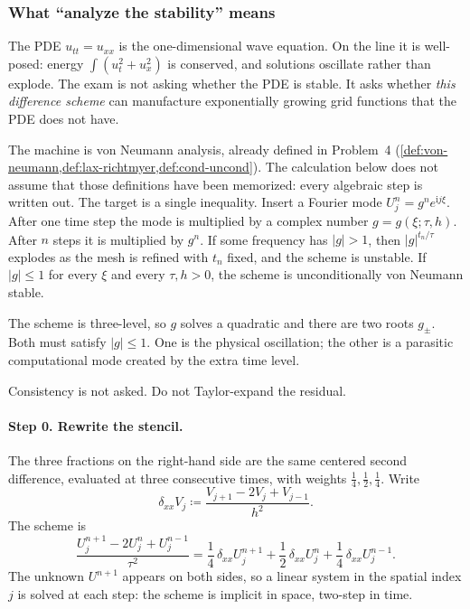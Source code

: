 \setcounter{section}{5}
\setcounter{theorem}{0}
\setcounter{definition}{0}
\setcounter{remark}{0}
\setcounter{note}{0}

\subsubsection{What ``analyze the stability'' means}

The PDE \(u_{tt}=u_{xx}\) is the one-dimensional wave equation. On the line it is well-posed: energy \(\int(u_t^2+u_x^2)\) is conserved, and solutions oscillate rather than explode. The exam is not asking whether the PDE is stable. It asks whether \emph{this difference scheme} can manufacture exponentially growing grid functions that the PDE does not have.

The machine is von Neumann analysis, already defined in Problem~4 (\cref{def:von-neumann,def:lax-richtmyer,def:cond-uncond}). The calculation below does not assume that those definitions have been memorized: every algebraic step is written out. The target is a single inequality. Insert a Fourier mode \(U_j^n=g^n e^{\mathrm i j\xi}\). After one time step the mode is multiplied by a complex number \(g=g(\xi;\tau,h)\). After \(n\) steps it is multiplied by \(g^n\). If some frequency has \(|g|>1\), then \(|g|^{t_n/\tau}\) explodes as the mesh is refined with \(t_n\) fixed, and the scheme is unstable. If \(|g|\le 1\) for every \(\xi\) and every \(\tau,h>0\), the scheme is unconditionally von Neumann stable.

The scheme is three-level, so \(g\) solves a quadratic and there are two roots \(g_\pm\). Both must satisfy \(|g|\le 1\). One is the physical oscillation; the other is a parasitic computational mode created by the extra time level.

Consistency is not asked. Do not Taylor-expand the residual.

\paragraph{Step 0. Rewrite the stencil.}

The three fractions on the right-hand side are the same centered second difference, evaluated at three consecutive times, with weights \(\frac14,\frac12,\frac14\). Write
\[
\delta_{xx}V_j
\coloneqq
\frac{V_{j+1}-2V_j+V_{j-1}}{h^2}.
\]
The scheme is
\[
\frac{U_j^{n+1}-2U_j^n+U_j^{n-1}}{\tau^2}
=
\frac14\,\delta_{xx}U_j^{n+1}
+
\frac12\,\delta_{xx}U_j^n
+
\frac14\,\delta_{xx}U_j^{n-1}.
\]
The unknown \(U^{n+1}\) appears on both sides, so a linear system in the spatial index \(j\) is solved at each step: the scheme is implicit in space, two-step in time.

